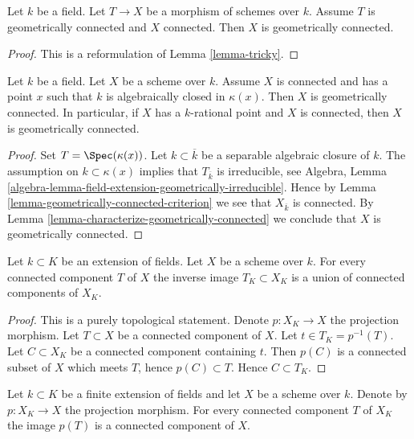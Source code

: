 \begin{lemma}
\label{lemma-geometrically-connected-criterion}
Let $k$ be a field. Let $T \to X$ be a morphism of schemes over $k$.
Assume $T$ is geometrically connected and $X$ connected.
Then $X$ is geometrically connected.
\end{lemma}

\begin{proof}
This is a reformulation of
Lemma \ref{lemma-tricky}.
\end{proof}

\begin{lemma}
\label{lemma-geometrically-connected-if-connected-and-point}
Let $k$ be a field. Let $X$ be a scheme over $k$.
Assume $X$ is connected and has a point $x$ such that
$k$ is algebraically closed in $\kappa(x)$.
Then $X$ is geometrically connected.
In particular, if $X$ has a $k$-rational point and $X$ is connected,
then $X$ is geometrically connected.
\end{lemma}

\begin{proof}
Set $T = \Spec(\kappa(x))$. Let $k \subset \overline{k}$ be a
separable algebraic closure of $k$. The assumption on $k \subset \kappa(x)$
implies that $T_{\overline{k}}$ is irreducible, see
Algebra, Lemma \ref{algebra-lemma-field-extension-geometrically-irreducible}.
Hence by
Lemma \ref{lemma-geometrically-connected-criterion}
we see that $X_{\overline{k}}$ is connected. By
Lemma \ref{lemma-characterize-geometrically-connected}
we conclude that $X$ is geometrically connected.
\end{proof}

\begin{lemma}
\label{lemma-inverse-image-connected-component}
Let $k \subset K$ be an extension of fields.
Let $X$ be a scheme over $k$.
For every connected component $T$ of $X$ the inverse image
$T_K \subset X_K$ is a union of connected components of $X_K$.
\end{lemma}

\begin{proof}
This is a purely topological statement.
Denote $p : X_K \to X$ the projection morphism.
Let $T \subset X$ be a connected component of $X$.
Let $t \in T_K = p^{-1}(T)$. Let $C \subset X_K$ be a connected component
containing $t$. Then $p(C)$ is a connected subset of $X$
which meets $T$, hence $p(C) \subset T$. Hence $C \subset T_K$.
\end{proof}

\begin{lemma}
\label{lemma-image-connected-component-finite-extension}
Let $k \subset K$ be a finite extension of fields and let $X$ be a scheme over 
$k$. Denote by $p : X_K \to X$ the projection morphism. For every connected 
component $T$ of $X_K$ the image $p(T)$ is a connected component of 
$X$.
\end{lemma}

